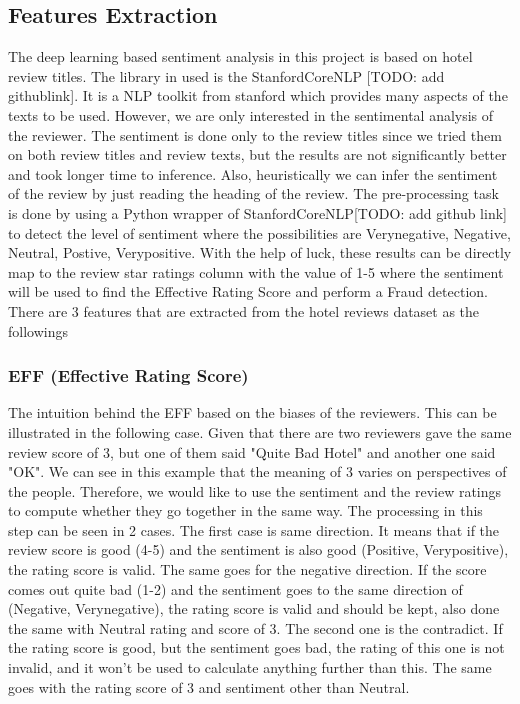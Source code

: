 \documentclass[conference]{IEEEtran}
\begin{document}
\subsection{Features Extraction}
The deep learning based sentiment analysis in this project is based on hotel review titles. The library in used is the StanfordCoreNLP [TODO: add githublink]. It is a NLP toolkit from stanford which provides many aspects of the texts to be used. However, we are only interested in the sentimental analysis of the reviewer. The sentiment is done only to the review titles since we tried them on both review titles and review texts, but the results are not significantly better and took longer time to inference. Also, heuristically we can infer the sentiment of the review by just reading the heading of the review. The pre-processing task is done by using a Python wrapper of StanfordCoreNLP[TODO: add github link] to detect the level of sentiment where the possibilities are Verynegative, Negative, Neutral, Postive, Verypositive. With the help of luck, these results can be directly map to the review star ratings column with the value of 1-5 where the sentiment will be used to find the Effective Rating Score and perform a Fraud detection. There are 3 features that are extracted from the hotel reviews dataset as the followings

\subsubsection{EFF (Effective Rating Score)}
The intuition behind the EFF based on the biases of the reviewers. This can be illustrated in the following case. Given that there are two reviewers gave the same review score of 3, but one of them said "Quite Bad Hotel" and another one said "OK". We can see in this example that the meaning of 3 varies on perspectives of the people. Therefore, we would like to use the sentiment and the review ratings to compute whether they go together in the same way. The processing in this step can be seen in 2 cases.  The first case is same direction. It means that if the review score is good (4-5) and the sentiment is also good (Positive, Verypositive), the rating score is valid. The same goes for the negative direction. If the score comes out quite bad (1-2) and the sentiment goes to the same direction of (Negative, Verynegative), the rating score is valid and should be kept, also done the same with Neutral rating and score of 3. The second one is the contradict. If the rating score is good, but the sentiment goes bad, the rating of this one is not invalid, and it won't be used to calculate anything further than this. The same goes with the rating score of 3 and sentiment other than Neutral.
\end{document}
